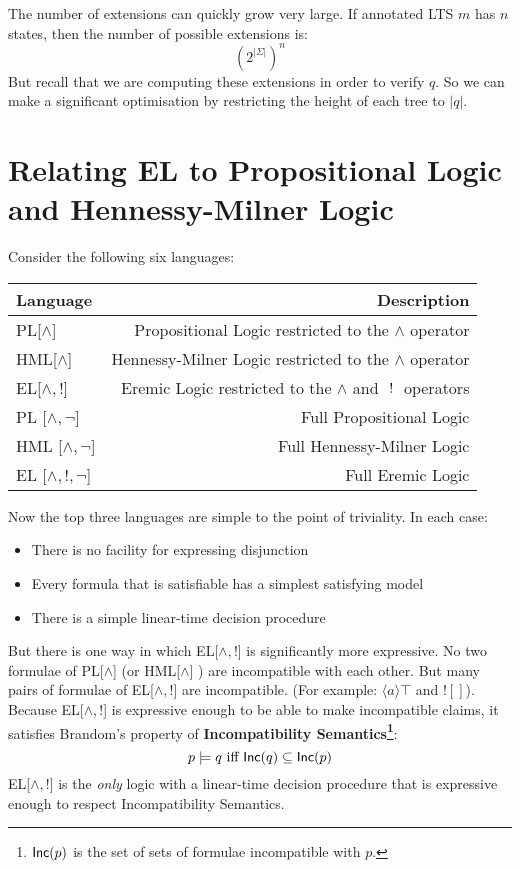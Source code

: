 The number of extensions can quickly grow very large.
If annotated LTS $m$ has $n$ states, then the number of possible extensions is:
\[
({2^{|\Sigma|}})^n
\] 
But recall that we are computing these extensions in order to verify $q$. So we can make a significant optimisation by restricting the height of each tree to $|q|$.

\section{Relating EL to Propositional Logic and Hennessy-Milner Logic}
Consider the following six languages:
\begin{center}
\begin{tabular}{ l | r }
Language & Description \\
\hline
PL[$\land$] & Propositional Logic restricted to the $\land$ operator \\
HML[$\land$] & Hennessy-Milner Logic restricted to the $\land$ operator \\
EL[$\land, !$] & Eremic Logic restricted to the $\land$ and $\ ! \ $ operators \\
PL [$\land, \neg$] & Full Propositional Logic \\
HML [$\land, \neg$] & Full Hennessy-Milner Logic \\
EL [$\land, !, \neg$] & Full Eremic Logic \\
\end{tabular}
\end{center}
Now the top three languages are simple to the point of triviality. In each case:
\begin{itemize}
\item
There is no facility for expressing disjunction
\item
Every formula that is satisfiable has a simplest satisfying model
\item
There is a simple linear-time decision procedure
\end{itemize}
But there is one way in which EL[$\land, !$]  is significantly more expressive.
No two formulae of PL[$\land$] (or HML[$\land$] ) are incompatible with each other. 
But many pairs of formulae of EL[$\land, !$] are incompatible.
(For example: $\langle a \rangle \top$ and $! []$). 
Because EL[$\land, !$]  is expressive enough to be able to make incompatible claims, it satisfies Brandom's property of {\bf Incompatibility Semantics\footnote{$\mathsf{Inc}(p)$ is the set of sets of formulae incompatible with $p$.}}:
\[
p \models q \mbox{ iff } \mathsf{Inc}(q) \subseteq \mathsf{Inc}(p)
\]
EL[$\land, !$]  is the \emph{only} logic with a linear-time decision procedure that is expressive enough to respect Incompatibility Semantics.

